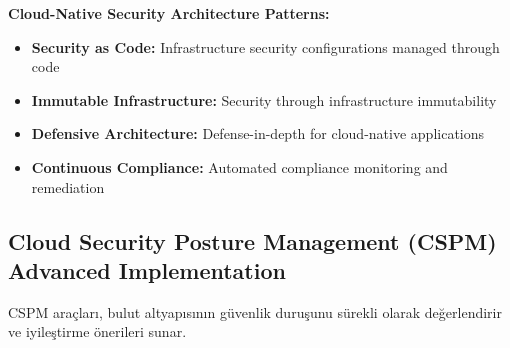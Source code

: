 \textbf{Cloud-Native Security Architecture Patterns:}
\begin{itemize}
    \item \textbf{Security as Code:} Infrastructure security configurations managed through code
    \item \textbf{Immutable Infrastructure:} Security through infrastructure immutability
    \item \textbf{Defensive Architecture:} Defense-in-depth for cloud-native applications
    \item \textbf{Continuous Compliance:} Automated compliance monitoring and remediation
\end{itemize}

\subsection{Cloud Security Posture Management (CSPM) Advanced Implementation}

CSPM araçları, bulut altyapısının güvenlik duruşunu sürekli olarak değerlendirir ve iyileştirme önerileri sunar.

